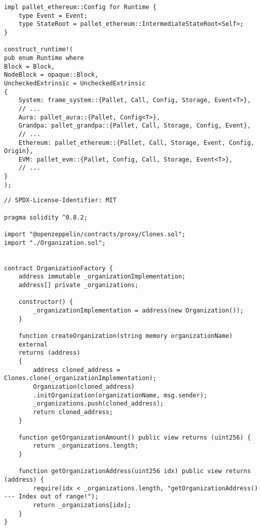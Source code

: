 \begin{lstlisting}[caption=Конфигурация узла сети блокчейн-сети, label = list1, style=realcode]
impl pallet_ethereum::Config for Runtime {
	type Event = Event;
	type StateRoot = pallet_ethereum::IntermediateStateRoot<Self>;
}

construct_runtime!(
pub enum Runtime where
Block = Block,
NodeBlock = opaque::Block,
UncheckedExtrinsic = UncheckedExtrinsic
{
	System: frame_system::{Pallet, Call, Config, Storage, Event<T>},
	// ...
	Aura: pallet_aura::{Pallet, Config<T>},
	Grandpa: pallet_grandpa::{Pallet, Call, Storage, Config, Event},
	// ...
	Ethereum: pallet_ethereum::{Pallet, Call, Storage, Event, Config, Origin},
	EVM: pallet_evm::{Pallet, Config, Call, Storage, Event<T>},
	// ...
}
);
\end{lstlisting}





\begin{lstlisting}[caption=Код контракта-фабрики учебных заведений, label = list2, style=realcode]
// SPDX-License-Identifier: MIT

pragma solidity ^0.8.2;

import "@openzeppelin/contracts/proxy/Clones.sol";
import "./Organization.sol";


contract OrganizationFactory { 
	address immutable _organizationImplementation;
	address[] private _organizations;
	
	constructor() {
		_organizationImplementation = address(new Organization());
	}
	
	function createOrganization(string memory organizationName)
	external
	returns (address)
	{
		address cloned_address = Clones.clone(_organizationImplementation);
		Organization(cloned_address)
		.initOrganization(organizationName, msg.sender);
		_organizations.push(cloned_address);
		return cloned_address;
	}
	
	function getOrganizationAmount() public view returns (uint256) {
		return _organizations.length;
	}
	
	function getOrganizationAddress(uint256 idx) public view returns (address) {
		require(idx < _organizations.length, "getOrganizationAddress() --- Index out of range!");
		return _organizations[idx];
	} 
}
\end{lstlisting}


